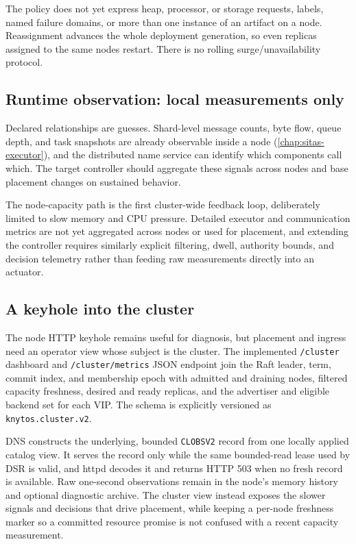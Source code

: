 The policy does not yet express heap, processor, or storage requests, labels,
named failure domains, or more than one instance of an artifact on a node.
Reassignment advances the whole deployment generation, so even replicas assigned
to the same nodes restart. There is no rolling surge/unavailability protocol.

\subsection{Runtime observation: local measurements only}

Declared relationships are guesses. Shard-level message counts, byte flow,
queue depth, and task snapshots are already observable inside a node
(\autoref{chap:sitas-executor}), and the distributed name service can identify which components
call which. The target controller should aggregate these signals across
nodes and base placement changes on sustained behavior.

The node-capacity path is the first cluster-wide feedback loop, deliberately
limited to slow memory and CPU pressure. Detailed executor and communication
metrics are not yet aggregated across nodes or used for placement, and extending
the controller requires similarly explicit filtering, dwell, authority bounds,
and decision telemetry rather than feeding raw measurements directly into an
actuator.

\subsection{A keyhole into the cluster}
\label{sec:cluster-keyhole}

The node HTTP keyhole remains useful for diagnosis, but placement and ingress
need an operator view whose subject is the cluster. The implemented
\texttt{/cluster} dashboard and \texttt{/cluster/metrics} JSON endpoint join
the Raft leader, term, commit index, and membership epoch with admitted and
draining nodes, filtered capacity freshness, desired and ready replicas, and
the advertiser and eligible backend set for each VIP. The schema is explicitly
versioned as \texttt{knytos.cluster.v2}.

DNS constructs the underlying, bounded \texttt{CLOBSV2} record from one
locally applied catalog view. It serves the record only while the same
bounded-read lease used by DSR is valid, and httpd decodes it and returns HTTP 503
when no fresh record is available. Raw one-second observations remain in the
node's memory history and optional diagnostic archive. The cluster view instead exposes the slower signals and
decisions that drive placement, while keeping a per-node freshness marker
so a committed resource promise is not confused with a recent capacity
measurement.


